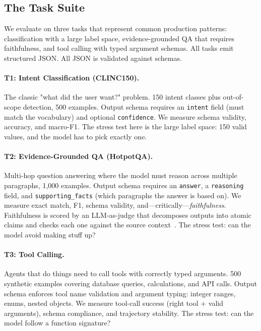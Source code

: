 \documentclass[11pt]{article}
\begin{document}
\subsection{The Task Suite}
\label{sec:tasks}

We evaluate on three tasks that represent common production patterns: classification with a large label space, evidence-grounded QA that requires faithfulness, and tool calling with typed argument schemas.
All tasks emit structured JSON.
All JSON is validated against schemas.

\paragraph{T1: Intent Classification (CLINC150).}
The classic "what did the user want?" problem.
150 intent classes plus out-of-scope detection, 500 examples.
Output schema requires an \texttt{intent} field (must match the vocabulary) and optional \texttt{confidence}.
We measure schema validity, accuracy, and macro-F1.
The stress test here is the large label space: 150 valid values, and the model has to pick exactly one.

\paragraph{T2: Evidence-Grounded QA (HotpotQA).}
Multi-hop question answering where the model must reason across multiple paragraphs, 1{,}000 examples.
Output schema requires an \texttt{answer}, a \texttt{reasoning} field, and \texttt{supporting\_facts} (which paragraphs the answer is based on).
We measure exact match, F1, schema validity, and---critically---\emph{faithfulness}.
Faithfulness is scored by an LLM-as-judge that decomposes outputs into atomic claims and checks each one against the source context~\citep{es2023ragas,min2023factscore}.
The stress test: can the model avoid making stuff up?

\paragraph{T3: Tool Calling.}
Agents that do things need to call tools with correctly typed arguments.
500 synthetic examples covering database queries, calculations, and API calls.
Output schema enforces tool name validation and argument typing: integer ranges, enums, nested objects.
We measure tool-call success (right tool + valid arguments), schema compliance, and trajectory stability.
The stress test: can the model follow a function signature?
\end{document}
